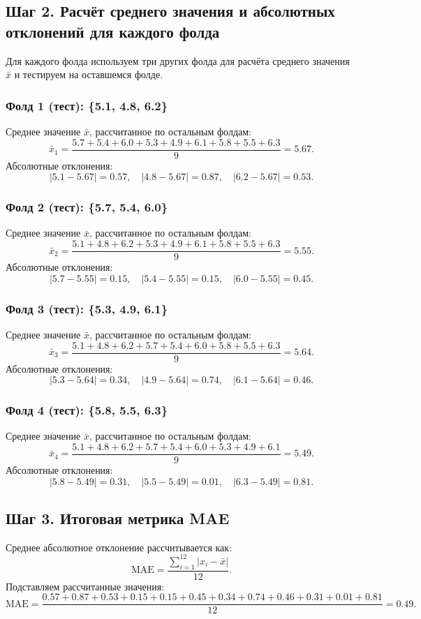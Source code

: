 \subsection*{Шаг 2. Расчёт среднего значения и абсолютных отклонений для каждого фолда}
Для каждого фолда используем три других фолда для расчёта среднего значения \(\bar{x}\) и тестируем на оставшемся фолде.

\subsubsection*{Фолд 1 (тест): \{5.1, 4.8, 6.2\}}
Среднее значение \(\bar{x}\), рассчитанное по остальным фолдам:
\[
    \bar{x}_1 = \frac{5.7 + 5.4 + 6.0 + 5.3 + 4.9 + 6.1 + 5.8 + 5.5 + 6.3}{9} = 5.67.
\]
Абсолютные отклонения:
\[
    |5.1 - 5.67| = 0.57, \quad |4.8 - 5.67| = 0.87, \quad |6.2 - 5.67| = 0.53.
\]

\subsubsection*{Фолд 2 (тест): \{5.7, 5.4, 6.0\}}
Среднее значение \(\bar{x}\), рассчитанное по остальным фолдам:
\[
    \bar{x}_2 = \frac{5.1 + 4.8 + 6.2 + 5.3 + 4.9 + 6.1 + 5.8 + 5.5 + 6.3}{9} = 5.55.
\]
Абсолютные отклонения:
\[
    |5.7 - 5.55| = 0.15, \quad |5.4 - 5.55| = 0.15, \quad |6.0 - 5.55| = 0.45.
\]

\subsubsection*{Фолд 3 (тест): \{5.3, 4.9, 6.1\}}
Среднее значение \(\bar{x}\), рассчитанное по остальным фолдам:
\[
    \bar{x}_3 = \frac{5.1 + 4.8 + 6.2 + 5.7 + 5.4 + 6.0 + 5.8 + 5.5 + 6.3}{9} = 5.64.
\]
Абсолютные отклонения:
\[
    |5.3 - 5.64| = 0.34, \quad |4.9 - 5.64| = 0.74, \quad |6.1 - 5.64| = 0.46.
\]

\subsubsection*{Фолд 4 (тест): \{5.8, 5.5, 6.3\}}
Среднее значение \(\bar{x}\), рассчитанное по остальным фолдам:
\[
    \bar{x}_4 = \frac{5.1 + 4.8 + 6.2 + 5.7 + 5.4 + 6.0 + 5.3 + 4.9 + 6.1}{9} = 5.49.
\]
Абсолютные отклонения:
\[
    |5.8 - 5.49| = 0.31, \quad |5.5 - 5.49| = 0.01, \quad |6.3 - 5.49| = 0.81.
\]

\subsection*{Шаг 3. Итоговая метрика MAE}
Среднее абсолютное отклонение рассчитывается как:
\[
    \text{MAE} = \frac{\sum_{i=1}^{12} |x_i - \bar{x}|}{12}.
\]
Подставляем рассчитанные значения:
\[
    \text{MAE} = \frac{0.57 + 0.87 + 0.53 + 0.15 + 0.15 + 0.45 + 0.34 + 0.74 + 0.46 + 0.31 + 0.01 + 0.81}{12} = 0.49.
\]

